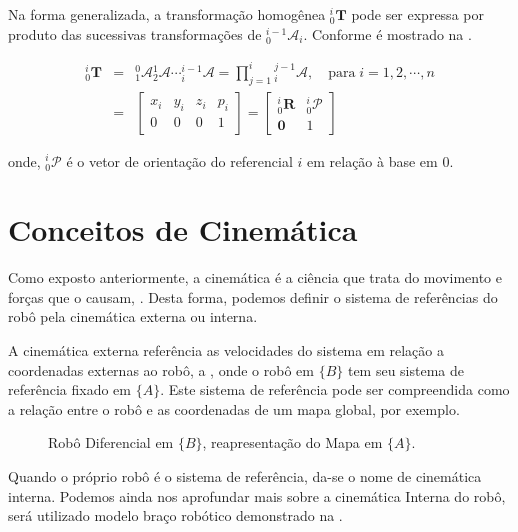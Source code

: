Na forma generalizada, a transformação homogênea ${}^{i}_0\mathbf{T}$ pode ser expressa por produto das sucessivas transformações de ${}^{i-1}_0\mathcal{A}_i$. Conforme é mostrado na .

\begin{equation}\label{fig:cine3}
    \begin{array}{lcl}
        {}^i_0\mathbf{T} &= & {}^0_1\mathcal{A}{}^1_2\mathcal{A} \cdots {}^{i-1}_i\mathcal{A} = \prod \limits^i_{j=1}{}^{j-1}_i\mathcal{A}, \quad \mathrm{para\;}i=1,2,\cdots,n\\[.2cm]
        & = &
    \begin{bmatrix}
        x_i & y_i & z_i & p_i\\
        0 & 0 & 0 & 1
    \end{bmatrix} = 
    \begin{bmatrix}
        {}^i_0\mathbf{R} & {}^i_0\mathcal{P}\\
        \mathbf{0} & 1
    \end{bmatrix}
    \end{array}
\end{equation}
    
\noindent onde, ${}^i_0\mathcal{P}$ é o vetor de orientação do referencial $i$ em relação à base em  $0$.


\section{Conceitos de Cinemática}\label{intro-ch1}

Como exposto anteriormente, a cinemática é a ciência que trata do movimento e forças que o causam, \cite{craig2009introduction, klancar2017wheeled}. Desta forma, podemos definir o sistema de referências do robô pela cinemática externa ou interna. 

A cinemática externa referência as velocidades do sistema em relação a coordenadas externas ao robô, a , onde o robô em $\{B\}$ tem seu sistema de referência fixado em $\{A\}$. Este sistema de referência  pode ser compreendida como a relação entre o robô e as coordenadas de um mapa global, por exemplo.

\begin{figure}[!ht]
    \centering
    
    \caption{Robô Diferencial em $\{B\}$, reapresentação do Mapa em $\{A\}$.}
    \label{fig:cardes}
\end{figure}

Quando o próprio robô é o sistema de referência, da-se o nome de cinemática interna. 
Podemos ainda nos aprofundar mais sobre a cinemática Interna do robô, será utilizado modelo braço robótico demonstrado na .

